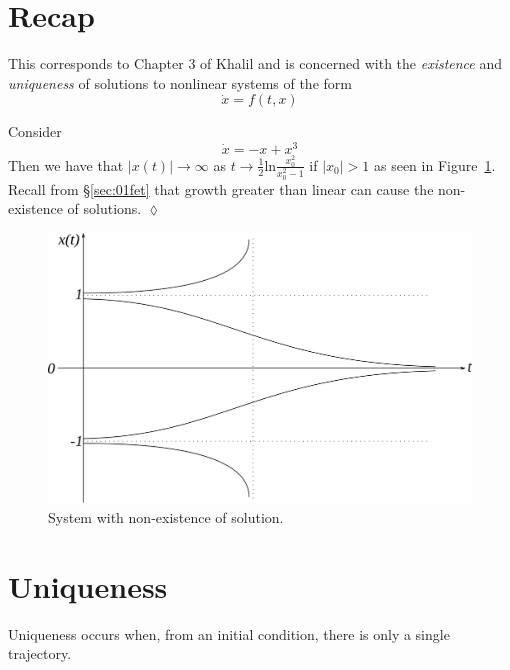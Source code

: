 \mainmatter%
\setcounter{page}{1}

\lectureseries[\course]{\course}

\date{January 14, 2010}

\setaddress%

\setcounter{lecture}{3}
\setcounter{chapter}{3}


\section{Recap}
This corresponds to Chapter 3 of Khalil and is concerned with the \textit{existence} and \textit{uniqueness} of solutions to nonlinear systems of the form
$$\dot{x} = f(t,x)$$

\begin{example}
Consider
$$\dot{x} = -x + x^3$$
Then we have that $|x(t)|\to\infty$ as $t\to\tfrac{1}{2}\text{ln}\frac{x_0^2}{x_0^2-1}$ if $|x_0|>1$ as seen in Figure~\ref{fig:04nonexist}.
Recall from \S\ref{sec:01fet} that growth greater than linear can cause the non-existence of solutions.
$\lozenge$
\end{example}

\begin{figure}[ht!]
\centering
\includegraphics[width=.5\textwidth]{images/04nonexist}
\caption{System with non-existence of solution.}
\label{fig:04nonexist}
\end{figure}

\section{Uniqueness}
Uniqueness occurs when, from an initial condition, there is only a single trajectory.

